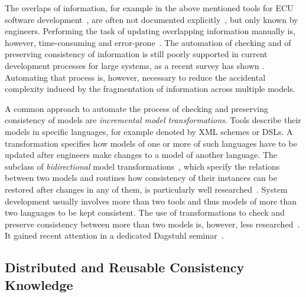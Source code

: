 The overlaps of information, for example in the above mentioned tools for \gls{ECU} software development~\cite{giese2010a}, are often not documented explicitly~\cite{mazkatli2017ase}, but only known by engineers.
Performing the task of updating overlapping information manually is, however, time-consuming and error-prone~.
The automation of checking and of preserving consistency of information is still poorly supported in current development processes for large systems, as a recent survey has shown .
Automating that process is, however, necessary to reduce the accidental complexity induced by the fragmentation of information across multiple models.

A common approach to automate the process of checking and preserving consistency of models are \emph{incremental model transformations}.
Tools describe their models in specific languages, for example denoted by \gls{XML} schemes or \glspl{DSL}.
A transformation specifies how models of one or more of such languages have to be updated after engineers make changes to a model of another language.
The subclass of \emph{bidirectional} model transformations~\cite{stevens2010sosym}, which specify the relations between two models and routines how consistency of their instances can be restored after changes in any of them, is particularly well researched~\cite{cleve2019dagstuhl,kahani2018SurveyTransformationTools-SoSym}.
System development usually involves more than two tools and thus models of more than two languages to be kept consistent.
The use of transformations to check and preserve consistency between more than two models is, however, less researched~\cite{stevens2020BidirectionalTransformationLarge-SoSym}.
It gained recent attention in a dedicated Dagstuhl seminar~\cite{cleve2019dagstuhl}.


\subsection{Distributed and Reusable Consistency Knowledge} %

